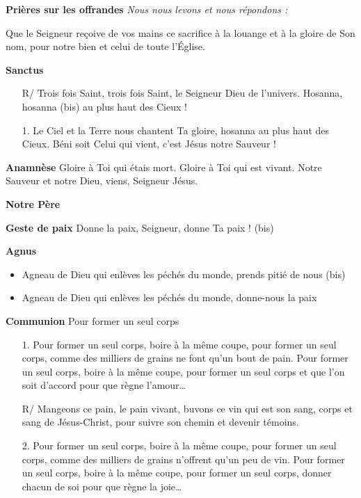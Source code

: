 \documentclass[10pt,a4paper]{article}
\newcommand{\NewsItem}[1]{%
\vspace{4pt}
		\large \textbf{#1} \vspace{4pt}
        \normalsize \normalfont}
\begin{document}
\NewsItem{Prières sur les offrandes}
\textit{Nous nous levons et nous répondons : }

Que le Seigneur reçoive de vos mains ce sacrifice à la louange et à la gloire 
de Son nom, pour notre bien et celui de toute l’Église.

\NewsItem{Sanctus}
\begin{itemize}
\item[R/] Trois fois Saint, trois fois Saint, le Seigneur Dieu de l’univers. 
      Hosanna, hosanna (bis) au plus haut des Cieux ! 
\item[1.]  Le Ciel et la Terre nous chantent Ta gloire, hosanna au plus haut des Cieux. 
      Béni soit Celui qui vient, c’est Jésus notre Sauveur ! 
\end{itemize}

\NewsItem{Anamnèse}
Gloire à Toi qui étais mort. Gloire à Toi qui est vivant.  
Notre Sauveur et notre Dieu, viens, Seigneur Jésus.

\NewsItem{Notre Père}

\NewsItem{Geste de paix}
Donne la paix, Seigneur, donne Ta paix ! (bis) 

\NewsItem{Agnus}
\begin{itemize}
    \item 
    Agneau de Dieu qui enlèves les péchés du monde, prends pitié de nous (bis)
    \item
Agneau de Dieu qui enlèves les péchés du monde, donne-nous la paix
\end{itemize}

\NewsItem{Communion} Pour former un seul corps
\begin{itemize}
    \item [1.]
    Pour former un seul corps, boire à la même coupe, pour former un
       seul corps, comme des milliers de grains ne font qu’un bout de pain. 
       Pour former un seul corps, boire à la même coupe, pour former un seul 
       corps et que l’on soit d’accord pour que règne l’amour…
\item[R/]  Mangeons ce pain, le pain vivant, buvons ce vin qui est son sang, corps               
       et sang de Jésus-Christ, pour suivre son chemin et devenir témoins.

\item[2.]    Pour former un seul corps, boire à la même coupe, pour former un 
        seul corps, comme des milliers de grains n’offrent qu’un peu de vin. 
        Pour former un seul corps, boire à la même coupe, pour former un seul 
        corps, donner chacun de soi pour que règne la joie…
\end{itemize}
\end{document}
